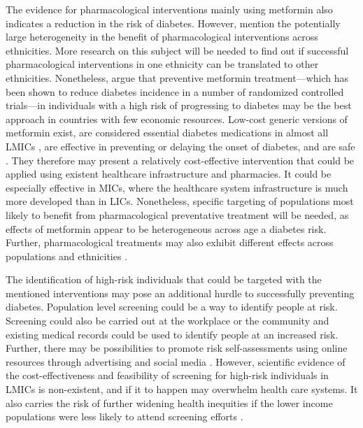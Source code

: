 The evidence for pharmacological interventions mainly using metformin also indicates a reduction in the risk of diabetes. However, \textcite{Cefalu2016} mention the potentially large heterogeneity in the benefit of pharmacological interventions across ethnicities. More research on this subject will be needed to find out if successful pharmacological interventions in one ethnicity can be translated to other ethnicities. Nonetheless, \textcite{Cefalu2016} argue that preventive metformin treatment---which has been shown to reduce diabetes incidence in a number of randomized controlled trials---in individuals with a high risk of progressing to diabetes may be the best approach in countries with few economic resources. Low-cost generic versions of metformin exist, are considered essential diabetes medications in almost all \acp{LMIC} \parencite{Bazargani2014}, are effective in preventing or delaying the onset of diabetes, and are safe \parencite{Gomes2013}. They therefore may present a relatively cost-effective intervention that could be applied using existent healthcare infrastructure and pharmacies. It could be especially effective in \acp{MIC}, where the healthcare system infrastructure is much more developed than in \acp{LIC}. Nonetheless, specific targeting of populations most likely to benefit from pharmacological preventative treatment will be needed, as effects of metformin appear to be heterogeneous across age a diabetes risk. Further, pharmacological treatments may also exhibit different effects across populations and ethnicities \parencite{Cefalu2016}. 

The identification of high-risk individuals that could be targeted with the mentioned interventions may pose an additional hurdle to successfully preventing diabetes. Population level screening could be a way to identify people at risk. Screening could also be carried out at the workplace or the community and existing medical records could be used to identify people at an increased risk. Further, there may be possibilities to promote risk self-assessments using online resources through advertising and social media \parencite{Cefalu2016}. However, scientific evidence of the cost-effectiveness and feasibility of screening for high-risk individuals in \acp{LMIC} is non-existent, and if it \DIFdelbegin {}\DIFdelend \DIFaddbegin {}\DIFaddend to happen may overwhelm health care systems. It also carries the risk of further widening health inequities if the lower income populations were less likely to attend screening efforts \parencite{Wareham2016}.



